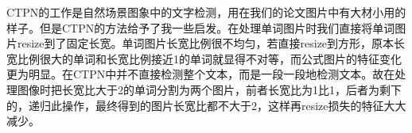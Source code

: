 CTPN的工作是自然场景图象中的文字检测，用在我们的论文图片中有大材小用的样子。但是CTPN的方法给予了我一些启发。在处理单词图片时我们直接将单词图片resize到了固定长宽。单词图片长宽比例很不均匀，若直接resize到方形，原本长宽比例很大的单词和长宽比例接近1的单词就显得不对等，而公式图片的特征变化更为明显。在CTPN中并不直接检测整个文本，而是一段一段地检测文本。故在处理图像时把长宽比大于2的单词分割为两个图片，前者长宽比为1比1，后者为剩下的，递归此操作，最终得到的图片长宽比都不大于2，这样再resize损失的特征大大减少。



